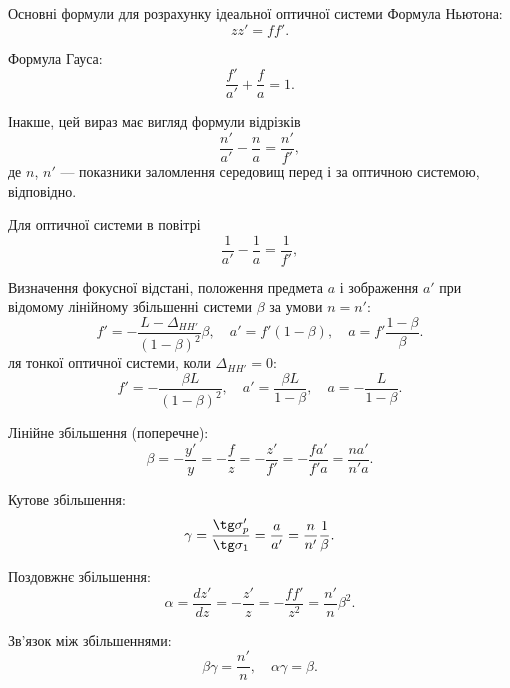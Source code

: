 \begin{Theory}{Основні формули для розрахунку ідеальної оптичної системи}
	Формула Ньютона:
	\begin{equation}
		zz' = ff'.
	\end{equation}

	Формула Гауса:
	\begin{equation}\label{eq:Gauss}
		\frac{f'}{a'} + \frac{f}{a} = 1.
	\end{equation}

	Інакше, цей вираз має вигляд формули відрізків
	\begin{equation}\label{eq:Gauss_a}
		\frac{n'}{a'} - \frac{n}{a} = \frac{n'}{f'}, \tag{\theequation a}
	\end{equation}
	де $n$, $n'$ --- показники заломлення середовищ перед і за оптичною системою, відповідно.

    Для оптичної системи в повітрі
   	\begin{equation}\label{eq:Gauss_b}
        \frac{1}{a'} - \frac{1}{a} = \frac{1}{f'}, \tag{\theequation б}
    \end{equation}

	Визначення фокусної відстані, положення предмета $a$ і зображення $a'$ при відомому лінійному збільшенні системи $\beta$ за умови $n = n'$:
	\begin{equation}\label{eq:thick_opt_sys}
		f' = - \frac{L - \Delta_{HH'}}{(1 - \beta)^2}\beta, \quad a' = f'(1- \beta), \quad a = f'\frac{1- \beta}{\beta}.
	\end{equation}
	ля тонкої оптичної системи, коли $\Delta_{HH'} = 0$:
	\begin{equation}\label{eq:thin_opt_sys}
		f' = - \frac{\beta L}{(1 - \beta)^2}, \quad a' = \frac{\beta L}{1- \beta}, \quad a = - \frac{L}{1 - \beta}. \tag{\theequation a}
	\end{equation}

	Лінійне збільшення (поперечне):
	\begin{equation}\label{eq:lens_linear_increas}
		\beta = -\frac{y'}{y} = -\frac{f}{z} = -\frac{z'}{f'} = - \frac{fa'}{f'a} =  \frac{na'}{n'a}.
	\end{equation}

	Кутове збільшення:
	\begin{equation}
		\gamma = \frac{\tg\sigma'_p}{\tg\sigma_1} = \frac{a}{a'} = \frac{n}{n'} \frac1\beta.
	\end{equation}

	Поздовжнє збільшення:
	\begin{equation}
		\alpha = \frac{d z'}{d z} = - \frac{z'}{z} = - \frac{ff'}{z^2} = \frac{n'}{n} \beta^2.
	\end{equation}

	Зв'язок між збільшеннями:
	\begin{equation}
		\beta\gamma = \frac{n'}{n}, \quad \alpha\gamma = \beta.
	\end{equation}

\end{Theory}





